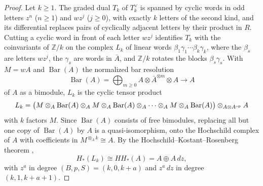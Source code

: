 \documentclass[11pt]{amsart}
\numberwithin{equation}{section}
\theoremstyle{definition}
\theoremstyle{remark}
\begin{document}
\begin{proof}
Let $k\ge1$. The graded dual $T_k$ of $T^\vee_k$ is spanned by cyclic words in odd letters $z^n$ ($n\ge1$) and $wz^j$ ($j\ge0$), with exactly $k$ letters of the second kind, and its differential replaces pairs of cyclically adjacent letters by their product in $R$. Cutting a cyclic word in front of each letter $wz^j$ identifies $T_k$ with the coinvariants of $\mathbb Z/k$ on the complex $L_k$ of linear words $\beta_1\gamma_1\cdots\beta_k\gamma_k$, where the $\beta_s$ are letters $wz^j$, the $\gamma_s$ are words in $\bar A$, and $\mathbb Z/k$ rotates the blocks $\beta_s\gamma_s$. With $M=wA$ and $\operatorname{Bar}(A)$ the normalized bar resolution
\begin{equation}\label{eq:bar}
\operatorname{Bar}(A)=\bigoplus_{m\ge0}A\otimes\bar A^{\otimes m}\otimes A\longrightarrow A
\end{equation}
of $A$ as a bimodule, $L_k$ is the cyclic tensor product
\begin{equation}\label{eq:Lk-cyclic}
L_k=\bigl(M\otimes_A\operatorname{Bar}(A)\otimes_AM\otimes_A\operatorname{Bar}(A)\otimes_A\cdots\otimes_AM\otimes_A\operatorname{Bar}(A)\bigr)\otimes_{A\otimes A^{\rm op}}A
\end{equation}
with $k$ factors $M$. Since $\operatorname{Bar}(A)$ consists of free bimodules, replacing all but one copy of $\operatorname{Bar}(A)$ by $A$ is a quasi-isomorphism, onto the Hochschild complex of $A$ with coefficients in $M^{\otimes_Ak}\cong A$. By the Hochschild--Kostant--Rosenberg theorem \cite{HKR62},
\begin{equation}\label{eq:HKR}
H_*(L_k)\cong HH_*(A)=A\oplus A\,dz ,
\end{equation}
with $z^a$ in degree $(B,p,S)=(k,0,k+a)$ and $z^a\,dz$ in degree $(k,1,k+a+1)$.


\end{proof}
\end{document}
